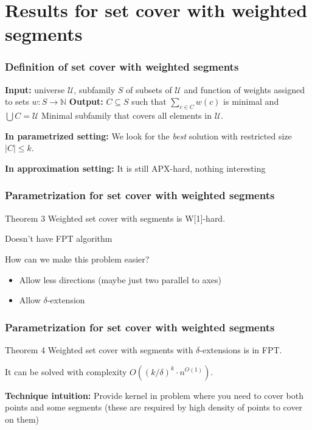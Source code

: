 \documentclass{beamer}
\begin{document}
\section{Results for set cover with weighted segments} 

\begin{frame}
\frametitle{Definition of set cover with weighted segments}

\textbf{Input:} universe $\mathcal{U}$,
subfamily $S$ of subsets of $\mathcal{U}$
and function of weights assigned to sets $w : S \rightarrow \mathbb{N}$
\newline
\textbf{Output:} $C \subseteq S$ such that $\sum_{c \in C} w(c)$ is minimal and
$\bigcup C = \mathcal{U}$
\newline
Minimal subfamily that covers all elements in $\mathcal{U}$.

\bigskip
\textbf{In parametrized setting:}
We look for the \textit{best} solution with restricted size $|C| \le k$.

\textbf{In approximation setting:}
It is still APX-hard, nothing interesting


\end{frame}

\begin{frame}
\frametitle{Parametrization for set cover with weighted segments}
\begin{block}{Theorem 3}
	Weighted set cover with segments is W[1]-hard.
	
	Doesn't have FPT algorithm
\end{block}

How can we make this problem easier?
\begin{itemize}
\item Allow less directions (maybe just two parallel to axes)
\item Allow $\delta$-extension
\end{itemize}
\end{frame}

\begin{frame}
\frametitle{Parametrization for set cover with weighted segments}
\begin{block}{Theorem 4}
	Weighted set cover with segments 
	with $\delta$-extensions is in FPT.
	
	It can be solved with complexity $O((k/\delta)^k \cdot n^{O(1)})$.
\end{block}

\textbf{Technique intuition:} Provide kernel in problem where you need to
cover both points and some segments (these are required
by high density of points to cover on them)
\end{frame}
\end{document}
